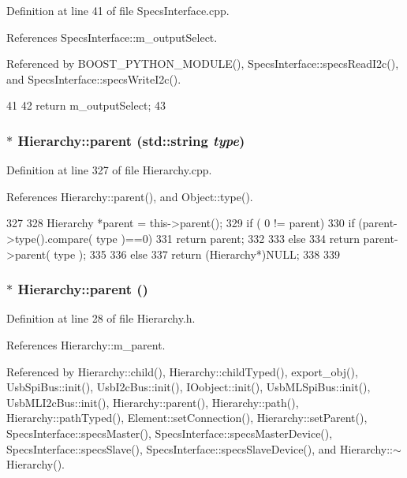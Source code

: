 Definition at line 41 of file SpecsInterface.cpp.

References SpecsInterface::m\_\-outputSelect.

Referenced by BOOST\_\-PYTHON\_\-MODULE(), SpecsInterface::specsReadI2c(), and SpecsInterface::specsWriteI2c().


\begin{DoxyCode}
41                                            {
42     return m_outputSelect;
43 }
\end{DoxyCode}
\hypertarget{classHierarchy_ad550588733bf75ac5c0fcfd7c8fd11a6}{
\subsubsection[{parent}]{ $\ast$ Hierarchy::parent (std::string {\em type})}}
\label{classHierarchy_ad550588733bf75ac5c0fcfd7c8fd11a6}


Definition at line 327 of file Hierarchy.cpp.

References Hierarchy::parent(), and Object::type().


\begin{DoxyCode}
327                                             {
328   Hierarchy *parent = this->parent();
329   if ( 0 != parent){
330     if (parent->type().compare( type )==0) {
331       return parent;
332     }
333     else
334       return parent->parent( type );
335   }
336   else {
337     return (Hierarchy*)NULL;
338   }
339 }
\end{DoxyCode}
\hypertarget{classHierarchy_a1c7bec8257e717f9c1465e06ebf845fc}{
\subsubsection[{parent}]{$\ast$ Hierarchy::parent ()}}
\label{classHierarchy_a1c7bec8257e717f9c1465e06ebf845fc}


Definition at line 28 of file Hierarchy.h.

References Hierarchy::m\_\-parent.

Referenced by Hierarchy::child(), Hierarchy::childTyped(), export\_\-obj(), UsbSpiBus::init(), UsbI2cBus::init(), IOobject::init(), UsbMLSpiBus::init(), UsbMLI2cBus::init(), Hierarchy::parent(), Hierarchy::path(), Hierarchy::pathTyped(), Element::setConnection(), Hierarchy::setParent(), SpecsInterface::specsMaster(), SpecsInterface::specsMasterDevice(), SpecsInterface::specsSlave(), SpecsInterface::specsSlaveDevice(), and Hierarchy::$\sim$Hierarchy().


